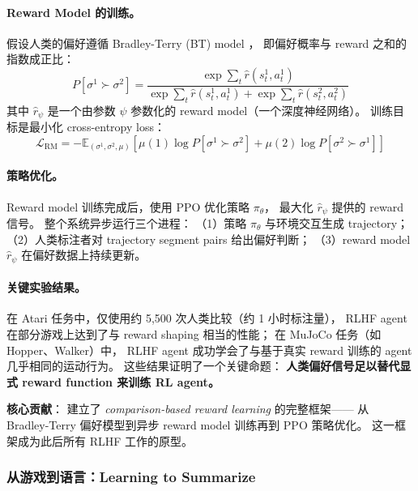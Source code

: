 \paragraph{Reward Model 的训练。}
假设人类的偏好遵循 Bradley-Terry (BT) model \cite{bradley1952bt}，
即偏好概率与 reward 之和的指数成正比：
\begin{equation}
\label{eq:pref:bt-christiano}
P[\sigma^1 \succ \sigma^2] = \frac{\exp\!\sum_t \hat{r}(s_t^1, a_t^1)}{\exp\!\sum_t \hat{r}(s_t^1, a_t^1) + \exp\!\sum_t \hat{r}(s_t^2, a_t^2)}
\end{equation}
其中 $\hat{r}_\psi$ 是一个由参数 $\psi$ 参数化的 reward model（一个深度神经网络）。
训练目标是最小化 cross-entropy loss：
\begin{equation}
\label{eq:pref:rm-loss-christiano}
\mathcal{L}_{\text{RM}} = -\mathbb{E}_{(\sigma^1, \sigma^2, \mu)}\left[
  \mu(1)\log P[\sigma^1 \succ \sigma^2] + \mu(2)\log P[\sigma^2 \succ \sigma^1]
\right]
\end{equation}

\paragraph{策略优化。}
Reward model 训练完成后，使用 PPO \cite{schulman2017ppo} 优化策略 $\pi_\theta$，
最大化 $\hat{r}_\psi$ 提供的 reward 信号。
整个系统异步运行三个进程：
（1）策略 $\pi_\theta$ 与环境交互生成 trajectory；
（2）人类标注者对 trajectory segment pairs 给出偏好判断；
（3）reward model $\hat{r}_\psi$ 在偏好数据上持续更新。

\paragraph{关键实验结果。}
在 Atari 任务中，仅使用约 5,500 次人类比较（约 1 小时标注量），
RLHF agent 在部分游戏上达到了与 reward shaping 相当的性能；
在 MuJoCo 任务（如 Hopper、Walker）中，
RLHF agent 成功学会了与基于真实 reward 训练的 agent 几乎相同的运动行为。
这些结果证明了一个关键命题：
\textbf{人类偏好信号足以替代显式 reward function 来训练 RL agent。}

\begin{solutionbox}
\textbf{核心贡献}：
建立了 \textit{comparison-based reward learning} 的完整框架——
从 Bradley-Terry 偏好模型到异步 reward model 训练再到 PPO 策略优化。
这一框架成为此后所有 RLHF 工作的原型。
\end{solutionbox}

\subsubsection{从游戏到语言：Learning to Summarize}
\label{sec:t2-summarize}

